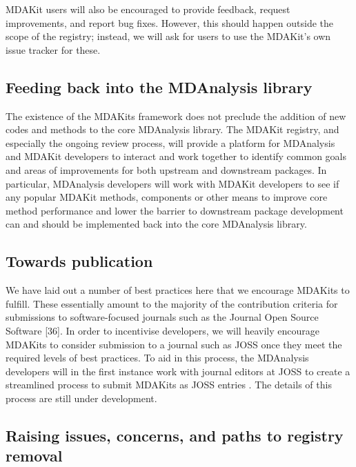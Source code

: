 \documentclass[9pt,whitepaper]{livecoms}
\begin{document}
MDAKit users will also be encouraged to provide feedback, request improvements, and report bug fixes. However, this should happen outside the scope of the registry; instead, we will ask for users to use the MDAKit’s own issue tracker for these.

\subsection{Feeding back into the MDAnalysis library}
\label{sec:feedingback}

The existence of the MDAKits framework does not preclude the addition of new codes and methods to the core MDAnalysis library. The MDAKit registry, and especially the ongoing review process, will provide a platform for MDAnalysis and MDAKit developers to interact and work together to identify common goals and areas of improvements for both upstream and downstream packages. In particular, MDAnalysis developers will work with MDAKit developers to see if any popular MDAKit methods, components or other means to improve core method performance and lower the barrier to downstream package development can and should be implemented back into the core MDAnalysis library.

\subsection{Towards publication}
\label{sec:publication}

We have laid out a number of best practices here that we encourage MDAKits to fulfill. These essentially amount to the majority of the contribution criteria for submissions to software-focused journals such as the Journal Open Source Software [36]. In order to incentivise developers, we will heavily encourage MDAKits to consider submission to a journal such as JOSS \cite{noauthor_journal_nodate} once they meet the required levels of best practices. To aid in this process, the MDAnalysis developers will in the first instance work with journal editors at JOSS to create a streamlined process to submit MDAKits as JOSS entries \cite{noauthor_submitting_2018}. The details of this process are still under development.

\subsection{Raising issues, concerns, and paths to registry removal}
\label{sec:removal}
\end{document}
